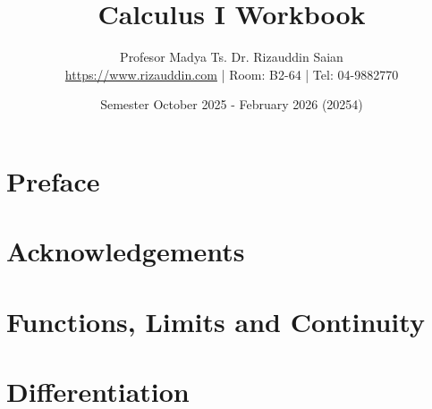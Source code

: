 \documentclass[12pt,a4paper,oneside]{report}
\title{Calculus I Workbook}
\author{Profesor Madya Ts. Dr. Rizauddin Saian\\
\url{https://www.rizauddin.com} | Room: B2-64 | Tel: 04-9882770
}
\date{Semester October 2025 - February 2026 (20254)}
\begin{document}

%
%
%
%

\frontmatter

\maketitle

\ifincludesow
    
    
\fi

\chapter*{Preface}


\chapter*{Acknowledgements}


\tableofcontents

\mainmatter
\chapter{Functions, Limits and Continuity}
\makenewpage
\makenewpage
\makenewpage
\makenewpage
\makenewpage
\makenewpage
\makenewpage

\chapter{Differentiation}
\makenewpage
\makenewpage
\makenewpage
\makenewpage
\makenewpage
\makenewpage
\end{document}
